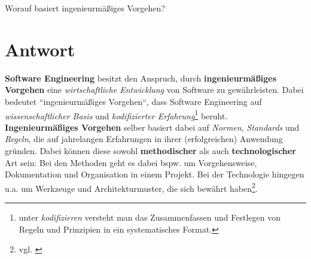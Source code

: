 Worauf basiert ingenieurmäßiges Vorgehen?


\section*{Antwort}
\textbf{Software Engineering} besitzt den Anspruch, durch \textbf{ingenieurmäßiges Vorgehen} eine \textit{wirtschaftliche Entwicklung} von Software zu gewährleisten.
Dabei bedeutet ``ingenieurmäßiges Vorgehen``, dass Software Engineering auf \textit{wissenschaftlicher Basis} und \textit{kodifizierter Erfahrung}\footnote{
    unter \textit{kodifizieren} versteht man das Zusammenfassen und Festlegen von Regeln und Prinzipien in ein systematisches Format.
} beruht.\\

\noindent
\textbf{Ingenieurmäßiges Vorgehen} selber basiert dabei auf \textit{Normen}, \textit{Standards} und \textit{Regeln}, die auf jahrelangen Erfahrungen in ihrer (erfolgreichen) Anwendung gründen.
Dabei können diese sowohl \textbf{methodischer} als auch \textbf{technologischer} Art sein: Bei den Methoden geht es dabei bspw. um Vorgehensweise, Dokumentation und Organisation in einem Projekt.
Bei der Technologie hingegen u.a. um Werkzeuge und Architekturmuster, die sich bewährt haben\footnote{vgl. \cite[2]{Wed09}}.
